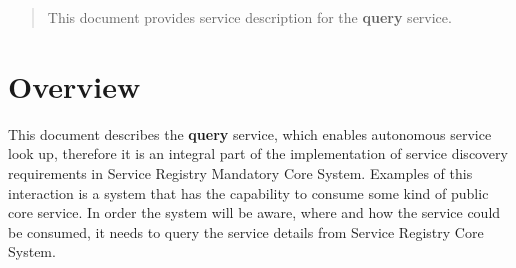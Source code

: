 \documentclass[a4paper]{arrowhead}
\begin{document}
\ArrowheadDate{\today}
\ArrowheadSetup

\begin{center}
  \vspace*{1cm}
  \huge{\arrowtitle}

  \vspace*{0.2cm}
  \LARGE{\arrowtype}
  \vspace*{1cm}

  \vspace*{\fill}


  \vspace*{1cm}
  \vspace*{\fill}

  \begin{abstract}
    This document provides service description for the \textbf{query} service. 
  \end{abstract}

  \vspace*{1cm}

 \end{center}

\newpage

\tableofcontents
\newpage

\section{Overview}
\label{sec:overview}
This document describes the \textbf{query} service, which enables autonomous service look up, therefore it is an integral part of the implementation of service discovery requirements in Service Registry Mandatory Core System. Examples of this interaction is a system that has the capability to consume some kind of public core service. In order the system will be aware, where and how the service could be consumed, it needs to query the service details from Service Registry Core System.
\end{document}
